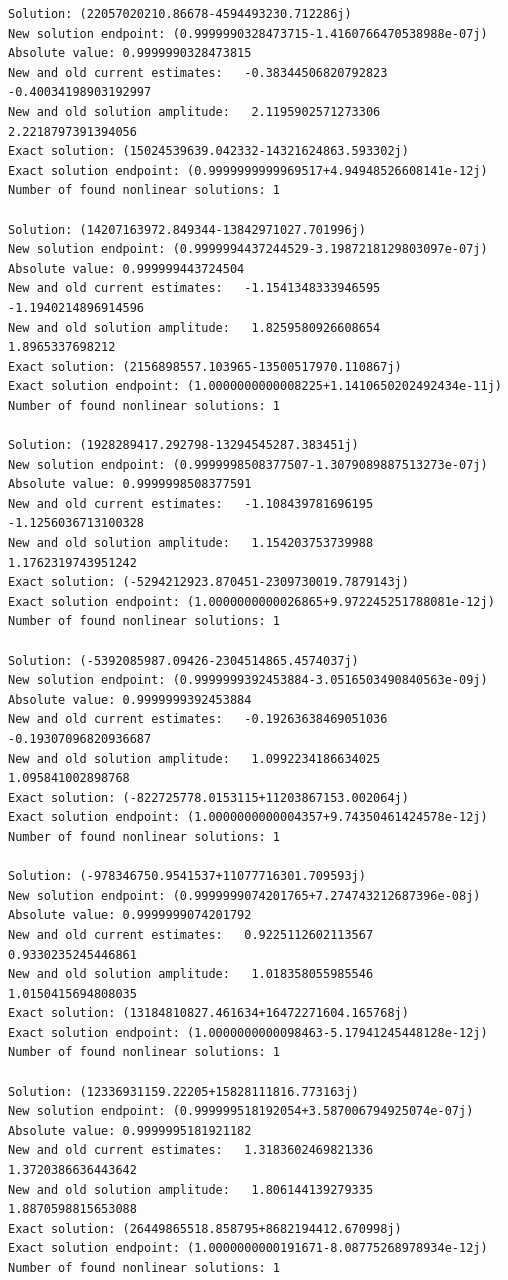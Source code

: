 \documentclass{article}
\begin{document}
\begin{verbatim}
Solution: (22057020210.86678-4594493230.712286j)
New solution endpoint: (0.9999990328473715-1.4160766470538988e-07j) Absolute value: 0.9999990328473815
New and old current estimates:   -0.38344506820792823    -0.40034198903192997
New and old solution amplitude:   2.1195902571273306    2.2218797391394056
Exact solution: (15024539639.042332-14321624863.593302j)
Exact solution endpoint: (0.9999999999969517+4.94948526608141e-12j)
Number of found nonlinear solutions: 1

Solution: (14207163972.849344-13842971027.701996j)
New solution endpoint: (0.9999994437244529-3.1987218129803097e-07j) Absolute value: 0.999999443724504
New and old current estimates:   -1.1541348333946595    -1.1940214896914596
New and old solution amplitude:   1.8259580926608654    1.8965337698212
Exact solution: (2156898557.103965-13500517970.110867j)
Exact solution endpoint: (1.0000000000008225+1.1410650202492434e-11j)
Number of found nonlinear solutions: 1

Solution: (1928289417.292798-13294545287.383451j)
New solution endpoint: (0.9999998508377507-1.3079089887513273e-07j) Absolute value: 0.9999998508377591
New and old current estimates:   -1.108439781696195    -1.1256036713100328
New and old solution amplitude:   1.154203753739988    1.1762319743951242
Exact solution: (-5294212923.870451-2309730019.7879143j)
Exact solution endpoint: (1.0000000000026865+9.972245251788081e-12j)
Number of found nonlinear solutions: 1

Solution: (-5392085987.09426-2304514865.4574037j)
New solution endpoint: (0.9999999392453884-3.0516503490840563e-09j) Absolute value: 0.9999999392453884
New and old current estimates:   -0.19263638469051036    -0.19307096820936687
New and old solution amplitude:   1.0992234186634025    1.095841002898768
Exact solution: (-822725778.0153115+11203867153.002064j)
Exact solution endpoint: (1.0000000000004357+9.74350461424578e-12j)
Number of found nonlinear solutions: 1

Solution: (-978346750.9541537+11077716301.709593j)
New solution endpoint: (0.9999999074201765+7.274743212687396e-08j) Absolute value: 0.9999999074201792
New and old current estimates:   0.9225112602113567    0.9330235245446861
New and old solution amplitude:   1.018358055985546    1.0150415694808035
Exact solution: (13184810827.461634+16472271604.165768j)
Exact solution endpoint: (1.0000000000098463-5.17941245448128e-12j)
Number of found nonlinear solutions: 1

Solution: (12336931159.22205+15828111816.773163j)
New solution endpoint: (0.999999518192054+3.587006794925074e-07j) Absolute value: 0.9999995181921182
New and old current estimates:   1.3183602469821336    1.3720386636443642
New and old solution amplitude:   1.806144139279335    1.8870598815653088
Exact solution: (26449865518.858795+8682194412.670998j)
Exact solution endpoint: (1.0000000000191671-8.08775268978934e-12j)
Number of found nonlinear solutions: 1


\end{verbatim}
\end{document}
